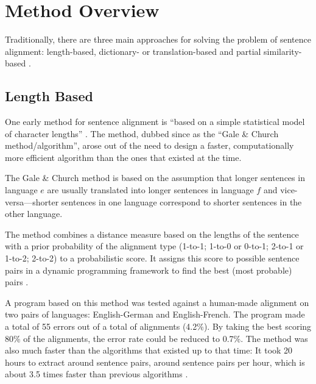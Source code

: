 \section{Method Overview}
\label{sec:overview_senalign}
Traditionally, there are three main approaches for solving the problem of sentence alignment:  length-based, dictionary- or translation-based and partial similarity-based \autocite{hunalign}. 

\subsection{Length Based}
One early method for sentence alignment is %
\enquote{based on a simple statistical model of character lengths} \autocite{gale-church-1991-program}. The method, dubbed since as the \enquote{Gale \& Church method/algorithm}, arose out of the need to design a faster, computationally more efficient algorithm than the ones that existed at the time\footnotemark.


The Gale \& Church method is based on the assumption that longer sentences in language \(e\) are usually translated into longer sentences in language \(f\) and vice-versa---shorter sentences in one language correspond to shorter sentences in the other language.

The method combines a distance measure based on the lengths of the sentence with a prior probability of the alignment type (1-to-1; 1-to-0 or 0-to-1; 2-to-1 or 1-to-2; 2-to-2) to a probabilistic score. 
It assigns this score to possible sentence pairs in a dynamic programming framework to find the best (most probable) pairs \autocite[57]{koehn2009}. 

A program based on this method was tested against a human-made alignment on two pairs of languages: English-German and English-French. 
The program made a total of 55 errors out of a total of  alignments (4.2\%). 
By taking the best scoring 80\% of the alignments, the error rate could be reduced to 0.7\%.
The method was also much faster than the algorithms that existed up to that time: 
It took 20 hours to extract around  sentence pairs, around  sentence pairs per hour, which is about 3.5 times faster than previous algorithms \autocite{gale-church-1991-program}.

